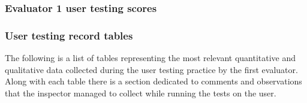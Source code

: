 
\subsubsection{Evaluator 1 user testing scores}

\subsubsection*{User testing record tables}
The following is a list of tables representing the most relevant quantitative and qualitative data collected during the user testing practice by the first evaluator.
Along with each table there is a section dedicated to comments and observations that the inspector managed to collect while running the tests on the user.

\vspace{0.8cm}

